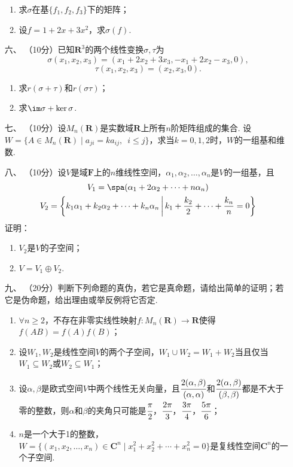 \begin{enumerate}
\begin{enumerate}[label=(\arabic*)]
        \item 求$\sigma$在基$\{f_1,f_2,f_3\}$下的矩阵；

        \item 设$f=1+2x+3x^2$，求$\sigma(f)$.
    \end{enumerate}
	\item[六、]（10分）已知$\mathbf{R}^3$的两个线性变换$\sigma,\tau$为
	\[\sigma(x_1,x_2,x_3)=(x_1+2x_2+3x_3,-x_1+2x_2-x_3,0),\]
    \[\tau(x_1,x_2,x_3)=(x_2,x_3,0).\]
    \begin{enumerate}[label=(\arabic*)]
        \item 求$r(\sigma+\tau)$和$r(\sigma\tau)$；

        \item 求$\im\sigma+\ker\sigma$.
    \end{enumerate}
	\item[七、]（10分）设$M_n(\mathbf{R})$是实数域$\mathbf{R}$上所有$n$阶矩阵组成的集合. 设$W=\{A\in M_n(\mathbf{R})\mid a_{ji}=ka_{ij},\enspace i\leqslant j\}$，求当$k=0,1,2$时，$W$的一组基和维数.

    \item[八、]（10分）设$V$是域$\mathbf{F}$上的$n$维线性空间，$\alpha_1,\alpha_2,\ldots,\alpha_n$是$V$的一组基，且
    \begin{gather*}
        V_1=\spa(\alpha_1+2\alpha_2+\cdots+n\alpha_n) \\
        V_2=\left\{k_1\alpha_1+k_2\alpha_2+\cdots+k_n\alpha_n \,\middle|\, k_1+\dfrac{k_2}{2}+\cdots+\dfrac{k_n}{n}=0\right\}
    \end{gather*}
    证明：
    \begin{enumerate}[label=(\arabic*)]
        \item $V_2$是$V$的子空间；

        \item $V=V_1\oplus V_2$.
    \end{enumerate}
	\item[九、]（20分）判断下列命题的真伪，若它是真命题，请给出简单的证明；若它是伪命题，给出理由或举反例将它否定.
    \begin{enumerate}[label=(\arabic*)]
        \item $\forall n\geqslant 2$，不存在非零实线性映射$f:M_n(\mathbf{R})\to\mathbf{R}$使得$f(AB)=f(A)f(B)$；

        \item 设$W_1,W_2$是线性空间$V$的两个子空间，$W_1\cup W_2=W_1+W_2$当且仅当$W_1\subseteq W_2$或$W_2\subseteq W_1$；

        \item 设$\alpha,\beta$是欧式空间$V$中两个线性无关向量，且$\cfrac{2(\alpha,\beta)}{(\alpha,\alpha)}$和$\cfrac{2(\alpha,\beta)}{(\beta,\beta)}$都是不大于零的整数，则$\alpha$和$\beta$的夹角只可能是$\cfrac{\pi}{2}$，$\cfrac{2\pi}{3}$，$\cfrac{3\pi}{4}$，$\cfrac{5\pi}{6}$；

        \item $n$是一个大于1的整数，$W=\{(x_1,x_2,\ldots,x_n)\in\mathbf{C}^n\mid x_1^2+x_2^2+\cdots+x_n^2=0\}$是复线性空间$\mathbf{C}^n$的一个子空间.
    \end{enumerate}
\end{enumerate}

\clearpage
